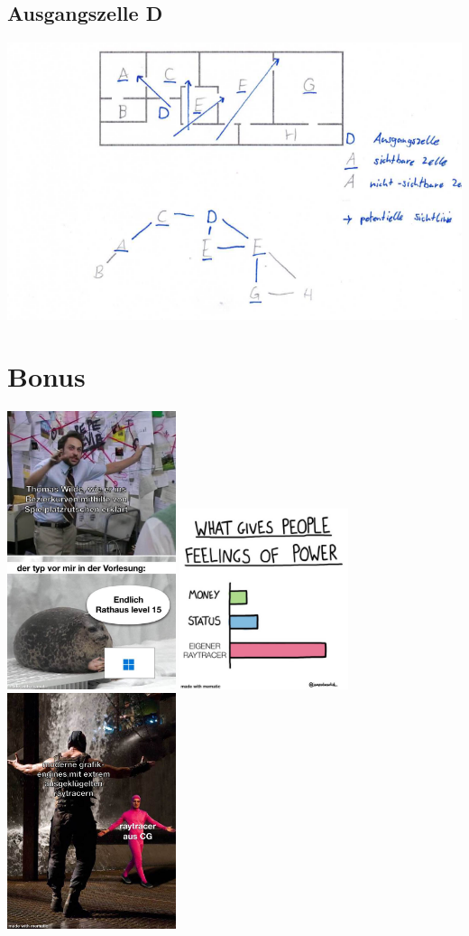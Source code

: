 \documentclass{article}
\begin{document}
\subsection*{Ausgangszelle D}
\includegraphics[width=400pt]{./files/Übung11.3.2.png}

\section{Bonus}
\includegraphics[width=140pt]{./files/Übung11.4.1.png}
\includegraphics[width=140pt]{./files/Übung11.4.2.png}
\includegraphics[width=140pt]{./files/Übung11.4.3.png}
\end{document}
